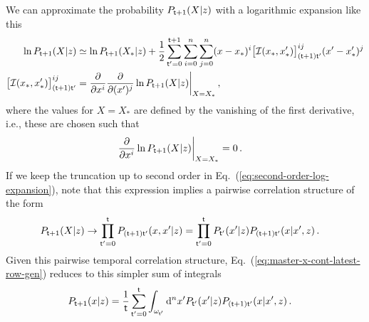 We can approximate the probability $P_{{\sf t}+1}(X\vert z)$ with a logarithmic expansion like this
\begin{align}
\ln P_{{\sf t}+1}(X\vert z) &\simeq \ln P_{{\sf t}+1}(X_*\vert z) + \frac{1}{2}\sum_{{\sf t}'=0}^{{\sf t}+1}\sum_{i=0}^{n}\sum_{j=0}^{n} (x-x_*)^i \big[{\cal I}(x_*,x'_*)\big]^{ij}_{({\sf t}+1){\sf t}'} (x'-x'_*)^j \label{eq:second-order-log-expansion} \\
\big[{\cal I}(x_*,x'_*)\big]^{ij}_{({\sf t}+1){\sf t}'} &= \frac{\partial}{\partial x^i}\frac{\partial}{\partial (x')^j}\ln P_{{\sf t}+1}(X\vert z) \bigg\vert_{X=X_*} \,,
\end{align}
where the values for $X=X_*$ are defined by the vanishing of the first derivative, i.e., these are chosen such that
\begin{align}
\frac{\partial}{\partial x^i}\ln P_{{\sf t}+1}(X\vert z) \bigg\vert_{X=X_*} &= 0 \,.
\end{align}
If we keep the truncation up to second order in Eq.~(\ref{eq:second-order-log-expansion}), note that this expression implies a pairwise correlation structure of the form
\begin{align}
P_{{\sf t}+1}(X\vert z) &\rightarrow \prod_{{\sf t}'=0}^{{\sf t}}P_{({\sf t}+1){\sf t}'}(x,x'\vert z) = \prod_{{\sf t}'=0}^{{\sf t}}P_{{\sf t}'}(x'\vert z)P_{({\sf t}+1){\sf t}'}(x\vert x', z) \,.
\end{align}
Given this pairwise temporal correlation structure, Eq.~(\ref{eq:master-x-cont-latest-row-gen}) reduces to this simpler sum of integrals
\begin{align}
P_{{\sf t}+1}(x\vert z) &= \frac{1}{{\sf t}}\sum_{{\sf t}'=0}^{{\sf t}}\int_{\omega_{{\sf t}'}}{\rm d}^nx' P_{{\sf t}'}(x'\vert z)P_{({\sf t}+1){\sf t}'}(x\vert x',z) \label{eq:second-order-correl} \,.
\end{align}

